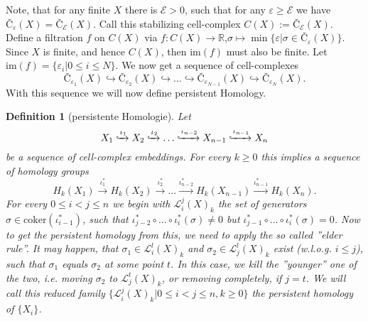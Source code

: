 \documentclass[11pt, a4paper,draft]{report}
\newtheorem{definition}{Definition}
\newcommand{\bR}{\mathbb{R}}
\newcommand{\im}{\textrm{im}}
\newcommand{\coker}{\textrm{coker}}
\begin{document}
	Note, that for any finite $X$ there is  $\mathcal{E}>0$, such that for any $\varepsilon\geq\mathcal{E}$ we have  $Č_\varepsilon(X) = Č_\mathcal{E}(X)$. Call this stabilizing cell-complex $C(X):=Č_\mathcal{E}(X)$. Define a filtration $f$ on $C(X)$ via $f:C(X)\rightarrow\bR$,$\sigma\mapsto\min\{\varepsilon|\sigma\in Č_\varepsilon(X)\}$. Since $X$ is finite, and hence $C(X)$, then $\im(f)$ must also be finite. Let $\im(f)=\{\varepsilon_i|0\leq i\leq N\}$. We now get a sequence of cell-complexes $$Č_{\varepsilon_1}(X)\hookrightarrow Č_{\varepsilon_2}(X)\hookrightarrow \ldots \hookrightarrow Č_{\varepsilon_{N-1}}(X)\hookrightarrow Č_{\varepsilon_N}(X).$$
	With this sequence we will now define persistent Homology.
	
	\begin{definition}[persistente Homologie]
		Let $$X_1\xhookrightarrow{\iota_1} X_2\xhookrightarrow{\iota_2} \ldots\xhookrightarrow{\iota_{n-2}} X_{n-1}\xhookrightarrow{\iota_{n-1}} X_n$$ be a sequence of cell-complex embeddings. For every $k\geq 0$ this implies a sequence of homology groups
		$$H_k(X_1)\xrightarrow{\iota_{1}^*} H_k(X_2)\xrightarrow{\iota_{2}^*}\ldots \xrightarrow{\iota_{n-2}^*} H_k(X_{n-1})\xrightarrow{\iota_{n-1}^*} H_k(X_n).$$
		For every $0\leq i<j\leq n$ we begin with $\mathcal{L}_i^j(X)_k$ the set of generators $\sigma\in\coker(\iota_{i-1}^*)$, such that $\iota_{j-2}^*\circ\ldots\circ\iota_{i}^*(\sigma)\neq0$ but $\iota_{j-1}^*\circ\ldots\circ\iota_{i}^*(\sigma)=0$. Now to get the persistent homology from this, we need to apply the so called ''elder rule''. It may happen, that $\sigma_1\in\mathcal{L}_i^l(X)_k$ and $\sigma_2\in\mathcal{L}_j^l(X)_k$ exist (w.l.o.g. $i\leq j$), such that $\sigma_1$ equals $\sigma_2$ at some point $t$. In this case, we kill the ''younger'' one of the two, i.e. moving $\sigma_2$ to $\mathcal{L}_j^t(X)_k$, or removing completely, if $j=t$. We will call this reduced family $\{\mathcal{L}_i^j(X)_k|0\leq i<j\leq n,k\geq0\}$ the persistent homology of $\{X_i\}$.
	\end{definition}
\end{document}
